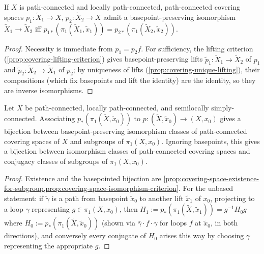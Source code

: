 \begin{proposition}
\label{prop:covering-space-isomorphism-criterion}
If $X$ is path-connected and locally path-connected, path-connected covering
spaces $p_1:\tilde X_1\to X$, $p_2:\tilde X_2\to X$ admit a basepoint-preserving
isomorphism $\tilde X_1\to\tilde X_2$ iff
$p_{1*}(\pi_1(\tilde X_1,\tilde x_1)) = p_{2*}(\pi_1(\tilde X_2,\tilde x_2))$.
\end{proposition}

\begin{proof}
Necessity is immediate from $p_1=p_2f$. For sufficiency, the lifting criterion
(\cref{prop:covering-lifting-criterion}) gives basepoint-preserving lifts
$\tilde p_1:\tilde X_1\to\tilde X_2$ of $p_1$ and $\tilde p_2:\tilde X_2\to\tilde X_1$ of $p_2$; by
uniqueness of lifts (\cref{prop:covering-unique-lifting}), their compositions (which fix
basepoints and lift the identity) are the identity, so they are inverse isomorphisms.
\end{proof}

\begin{theorem}
\label{thm:covering-space-classification}
Let $X$ be path-connected, locally path-connected, and semilocally
simply-connected. Associating $p_*(\pi_1(\tilde X,\tilde x_0))$ to $p:(\tilde X,\tilde x_0)\to(X,x_0)$
gives a bijection between basepoint-preserving isomorphism classes of
path-connected covering spaces of $X$ and subgroups of $\pi_1(X,x_0)$. Ignoring
basepoints, this gives a bijection between isomorphism classes of path-connected
covering spaces and conjugacy classes of subgroups of $\pi_1(X,x_0)$.
\end{theorem}

\begin{proof}
Existence and the basepointed bijection are
\cref{prop:covering-space-existence-for-subgroup,prop:covering-space-isomorphism-criterion}. For the
unbased statement: if $\tilde\gamma$ is a path from basepoint $\tilde x_0$ to another lift
$\tilde x_1$ of $x_0$, projecting to a loop $\gamma$ representing $g\in\pi_1(X,x_0)$, then
$H_1 := p_*(\pi_1(\tilde X,\tilde x_1)) = g^{-1}H_0g$ where $H_0 := p_*(\pi_1(\tilde X,\tilde x_0))$
(shown via $\bar\gamma\cdot f\cdot\gamma$ for loops $f$ at $\tilde x_0$, in both directions), and
conversely every conjugate of $H_0$ arises this way by choosing $\gamma$ representing
the appropriate $g$.
\end{proof}

